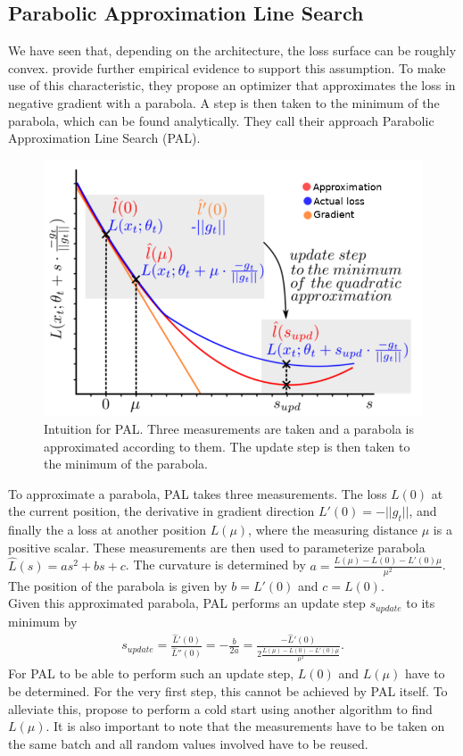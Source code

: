 \documentclass[a4paper]{scrartcl}
\begin{document}
\subsection*{Parabolic Approximation Line Search}
We have seen that, depending on the architecture, the loss surface can be roughly convex. \cite{mutschler2020parabolic} provide further empirical evidence to support this assumption. To make use of this characteristic, they propose an optimizer that approximates the loss in negative gradient with a parabola. A step is then taken to the minimum of the parabola, which can be found analytically. They call their approach Parabolic Approximation Line Search (PAL).

\begin{figure}[H]
	\centering
	\includegraphics[width=.6\linewidth]{figures/pal_1.png}
	\caption{Intuition for PAL. Three measurements are taken and a parabola is approximated according to them. The update step is then taken to the minimum of the parabola.}
	\label{fig:pal}
\end{figure}
To approximate a parabola, PAL takes three measurements. The loss $L(0)$ at the current position, the derivative in gradient direction $L'(0) = - ||g_t||$, and finally the a loss at another position $L(\mu)$, where the measuring distance $\mu$ is a positive scalar. These measurements are then used to parameterize parabola $\hat{L}(s) = as^2 + bs + c$. The curvature is determined by $a = \frac{L(\mu)-L(0) - L'(0)\mu}{\mu^2}$. The position of the parabola is given by $b=L'(0)$ and $c=L(0)$.\\
Given this approximated parabola, PAL performs an update step $s_{update}$ to its minimum by
\begin{align}
	s_{update} = \frac{\hat{L}'(0)}{\hat{L}''(0)} = -\frac{b}{2a} = \frac{-\hat{L}'(0)}{2\frac{L(\mu)-L(0) - L'(0)\mu}{\mu^2}}.
\end{align}
For PAL to be able to perform such an update step, $L(0)$ and $L(\mu)$ have to be determined. For the very first step, this cannot be achieved by PAL itself. To alleviate this, \cite{mutschler2020parabolic} propose to perform a cold start using another algorithm to find  $L(\mu)$. It is also important to note that the measurements have to be taken on the same batch and all random values involved have to be reused.\\
\end{document}
